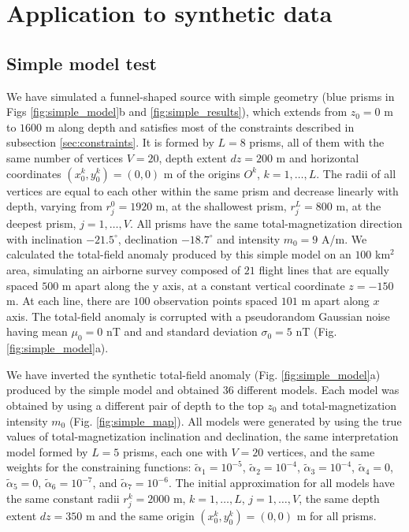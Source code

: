 \section{Application to synthetic data}\label{sec:synthetic}

\subsection{Simple model test}

We have simulated a funnel-shaped source with simple geometry (blue prisms in Figs \ref{fig:simple_model}b and \ref{fig:simple_results}), which extends from $z_0=0$ m to $1600$ m along depth and satisfies most of the constraints described in subsection \ref{sec:constraints}. It is formed by $L=8$ prisms, all of them with the same number of vertices $ V = 20 $, depth extent $ dz = 200 $ m and horizontal coordinates $ (x_0^k, y_0^k) = (0, 0) $ m of the origins $O^k$, $k=1,\dots,L$. The radii of all vertices are equal to each other within the same prism and decrease linearly with depth, varying from $r_j^0=1920$ m, at the shallowest prism, $r_j^L=800$ m, at the deepest prism, $j=1,\dots, V$. All prisms have the same total-magnetization direction with inclination $ -21.5^\circ $, declination $ -18.7^\circ $ and intensity $ m_0 = 9 $ A/m. We calculated the total-field anomaly produced by this simple model on an $ 100 $ km$^2$ area, simulating an airborne survey composed of $ 21 $ flight lines that are equally spaced $ 500 $ m apart along the y axis, at a constant vertical coordinate $ z = -150 $ m. At each line, there are $ 100 $ observation points spaced $101$ m apart along $ x $ axis. The total-field anomaly is corrupted with a pseudorandom Gaussian noise having mean $ \mu_0=0 $ nT and and standard deviation $ \sigma_0=5 $ nT (Fig. \ref{fig:simple_model}a).

We have inverted the synthetic total-field anomaly (Fig. \ref{fig:simple_model}a) produced by the simple model and obtained 36 different models. Each model was obtained by using a different pair of depth to the top $ z_0 $ and total-magnetization intensity $ m_0 $ (Fig. \ref{fig:simple_map}). All models were generated by using the true values of total-magnetization inclination and declination, the same interpretation model formed by $ L = 5 $ prisms, each one with $ V = 20 $ vertices, and the same weights for the constraining functions: $\tilde{\alpha}_1 = 10^{-5}$, $\tilde{\alpha}_2 = 10^{-4}$, $\tilde{\alpha}_3 = 10^{-4}$, $\tilde{\alpha}_4 = 0$, $\tilde{\alpha}_5 = 0$, $\tilde{\alpha}_6 = 10^{-7}$, and $\tilde{\alpha}_7 = 10^{-6}$. The initial approximation for all models have the same constant radii $ r^k_j = 2000 $ m, $ k = 1, \dots, L $, $ j  = 1, \dots, V $, the same depth extent $ dz = 350 $ m and the same origin $(x^k_0, y^k_0) = (0, 0) $ m for all prisms.


